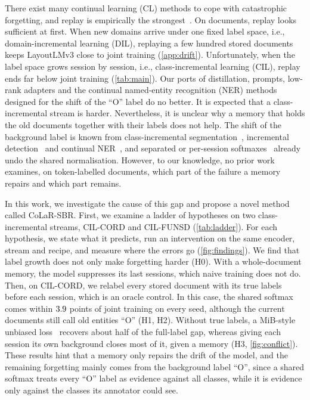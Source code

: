 \documentclass[10pt,twocolumn,letterpaper]{article}
\begin{document}
There exist many continual learning (CL) methods to cope with catastrophic forgetting, and replay is empirically the strongest~\citep{masana2022class,wang2024survey}. On documents, replay looks sufficient at first. When new domains arrive under one fixed label space, i.e., domain-incremental learning (DIL), replaying a few hundred stored documents keeps LayoutLMv3 close to joint training (\cref{app:drift}). Unfortunately, when the label space grows session by session, i.e., class-incremental learning (CIL), replay ends far below joint training (\cref{tab:main}). Our ports of distillation, prompts, low-rank adapters and the continual named-entity recognition (NER) methods designed for the shift of the ``O'' label do no better. It is expected that a class-incremental stream is harder. Nevertheless, it is unclear why a memory that holds the old documents together with their labels does not help. The shift of the background label is known from class-incremental segmentation~\citep{cermelli2020mib,douillard2021plop,cha2021ssul}, incremental detection~\citep{liu2023abr,mo2024bpf} and continual NER~\citep{monaikul2021extendner,zhang2023cpfd,ma2023learning}, and separated or per-session softmaxes~\citep{ahn2021ssil,kim2022more,liu2023ice} already undo the shared normalisation. However, to our knowledge, no prior work examines, on token-labelled documents, which part of the failure a memory repairs and which part remains.



In this work, we investigate the cause of this gap and propose a novel method called CoLaR-SBR. First, we examine a ladder of hypotheses on two class-incremental streams, CIL-CORD and CIL-FUNSD (\cref{tab:ladder}). For each hypothesis, we state what it predicts, run an intervention on the same encoder, stream and recipe, and measure where the errors go (\cref{fig:findings}). We find that label growth does not only make forgetting harder (H0). With a whole-document memory, the model suppresses its last sessions, which naive training does not do. Then, on CIL-CORD, we relabel every stored document with its true labels before each session, which is an oracle control. In this case, the shared softmax comes within $3.9$ points of joint training on every seed, although the current documents still call old entities ``O'' (H1, H2). Without true labels, a MiB-style unbiased loss~\citep{cermelli2020mib} recovers about half of the full-label gap, whereas giving each session its own background closes most of it, given a memory (H3, \cref{fig:conflict}). These results hint that a memory only repairs the drift of the model, and the remaining forgetting mainly comes from the background label ``O'', since a shared softmax treats every ``O'' label as evidence against all classes, while it is evidence only against the classes its annotator could see.
\end{document}
